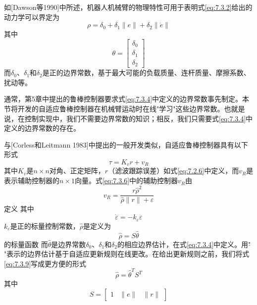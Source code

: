 \documentclass[UTF8]{ctexart}
\begin{document}
如[Dawson等1990]中所述，机器人机械臂的物理特性可用于表明式\eqref{eq:7.3.2}给出的动力学可以界定为
\begin{equation}\label{eq:7.3.4}
\rho = \delta_0 + \delta_1\|e\| + \delta_2\|\dot{e}\|
\end{equation}
其中
\begin{equation}\label{eq:7.3.5}
\theta = \begin{bmatrix} \delta_0 \\ \delta_1 \\ \delta_2 \end{bmatrix}
\end{equation}
而$\delta_0$、$\delta_1$和$\delta_2$是正的边界常数，基于最大可能的负载质量、连杆质量、摩擦系数、扰动等。

通常，第5章中提出的鲁棒控制器要求式\eqref{eq:7.3.4}中定义的边界常数事先制定。本节将开发的自适应鲁棒控制器在机械臂运动时在线"学习"这些边界常数。也就是说，在控制实现中，我们不需要边界常数的知识；相反，我们只需要式\eqref{eq:7.3.4}中定义的边界常数的存在。

与[Corless和Leitmann 1983]中提出的一般开发类似，自适应鲁棒控制器具有以下形式
\begin{equation}\label{eq:7.3.6}
\tau = K_v r + v_R
\end{equation}
其中$K_v$是$n \times n$对角、正定矩阵，$r$（滤波跟踪误差）如式\eqref{eq:7.2.6}中定义，而$v_R$是表示辅助控制器的$n \times 1$向量。式\eqref{eq:7.3.6}中的辅助控制器$v_R$由
\begin{equation}\label{eq:7.3.7}
v_R = \frac{r\hat{\rho}^2}{\hat{\rho}\|r\| + \varepsilon}
\end{equation}
定义
其中
\begin{equation}\label{eq:7.3.8}
\dot{\varepsilon} = -k_\varepsilon\varepsilon
\end{equation}
$k_\varepsilon$是正的标量控制常数，$\hat{\rho}$是定义为
\begin{equation}\label{eq:7.3.9}
\hat{\rho} = S\hat{\theta}
\end{equation}
的标量函数
而$\hat{\theta}$是边界常数$\delta_0$、$\delta_1$和$\delta_2$的相应边界估计，在式\eqref{eq:7.3.4}中定义。用"$\hat{}$"表示的边界估计基于自适应更新规则在线更改。在给出更新规则之前，我们将式\eqref{eq:7.3.9}写成更方便的形式
\begin{equation}\label{eq:7.3.10}
\hat{\rho} = \hat{\theta}^T S^T
\end{equation}
其中
\begin{equation*}
S = \begin{bmatrix} 1 & \|e\| & \|r\| \end{bmatrix}
\end{equation*}
\end{document}
